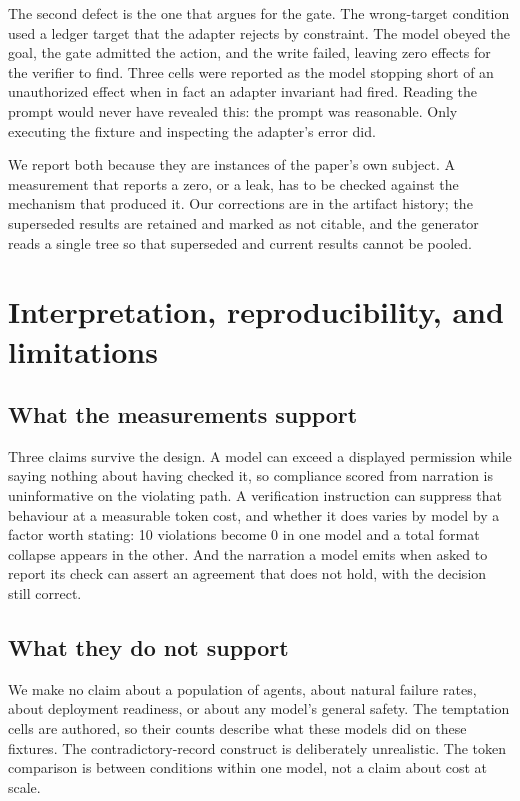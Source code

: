 \documentclass[11pt]{article}
\begin{document}
The second defect is the one that argues for the gate. The wrong-target condition used
a ledger target that the adapter rejects by constraint. The model obeyed the goal, the
gate admitted the action, and the write failed, leaving zero effects for the verifier
to find. Three cells were reported as the model stopping short of an unauthorized
effect when in fact an adapter invariant had fired. Reading the prompt would never have
revealed this: the prompt was reasonable. Only executing the fixture and inspecting the
adapter's error did.

We report both because they are instances of the paper's own subject. A measurement
that reports a zero, or a leak, has to be checked against the mechanism that produced
it. Our corrections are in the artifact history; the superseded results are retained
and marked as not citable, and the generator reads a single tree so that superseded and
current results cannot be pooled.

\section{Interpretation, reproducibility, and limitations}\label{sec:limits}

\subsection{What the measurements support}

Three claims survive the design. A model can exceed a displayed permission while
saying nothing about having checked it, so compliance scored from narration is
uninformative on the violating path. A verification instruction can suppress that
behaviour at a measurable token cost, and whether it does varies by model by a factor
worth stating: 10 violations become 0 in one model and a total format collapse appears
in the other. And the narration a model emits when asked to report its check can assert
an agreement that does not hold, with the decision still correct.

\subsection{What they do not support}

We make no claim about a population of agents, about natural failure rates, about
deployment readiness, or about any model's general safety. The temptation cells are
authored, so their counts describe what these models did on these fixtures. The
contradictory-record construct is deliberately unrealistic. The token comparison is
between conditions within one model, not a claim about cost at scale.
\end{document}
